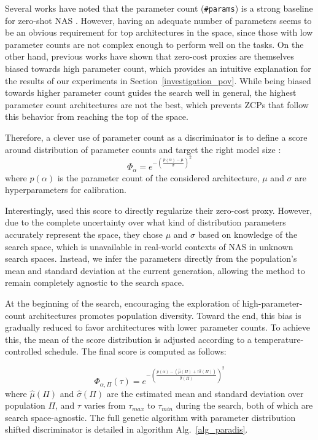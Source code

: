 \documentclass[10pt]{article} %
\begin{document}
Several works have noted that the parameter count (\texttt{\#params}) is a strong baseline for zero-shot NAS \citep{colin2022adeeperlook, javaheripi2022litetransformersearch}. However, having an adequate number of parameters seems to be an obvious requirement for top architectures in the space, since those with low parameter counts are not complex enough to perform well on the tasks. On the other hand, previous works \citep{kadlecova2024surprisingly, krishnakumar2022bench} have shown that zero-cost proxies are themselves biased towards high parameter count, which provides an intuitive explanation for the results of our experiments in Section~\ref{investigation_pov}. While being biased towards higher parameter count guides the search well in general, the highest parameter count architectures are not the best, which prevents ZCPs that follow this behavior from reaching the top of the space.

Therefore, a clever use of parameter count as a discriminator is to define a score around distribution of parameter counts and target the right model size :
$$
\Phi_\alpha = e^{-(\frac{p(\alpha) - \mu}{\sigma})^2}
$$
where $p(\alpha)$ is the parameter count of the considered architecture, $\mu$ and $\sigma$ are hyperparameters for calibration.

Interestingly, \citet{peng2024swap} used this score to directly regularize their zero-cost proxy. However, due to the complete uncertainty over what kind of distribution parameters accurately represent the space, they chose $\mu$ and $\sigma$ based on knowledge of the search space, which is unavailable in real-world contexts of NAS in unknown search spaces. Instead, we infer the parameters directly from the population's mean and standard deviation at the current generation, allowing the method to remain completely agnostic to the search space.

At the beginning of the search, encouraging the exploration of high-parameter-count architectures promotes population diversity. Toward the end, this bias is gradually reduced to favor architectures with lower parameter counts. To achieve this, the mean of the score distribution is adjusted according to a temperature-controlled schedule. The final score is computed as follows:

$$
\Phi_{\alpha, \Pi}(\tau) = e^{-(\frac{p(\alpha) - (\hat{\mu}(\Pi) + \tau\hat{\sigma}(\Pi))}{\hat{\sigma}(\Pi)})^2}
$$
where $\hat{\mu}(\Pi)$ and $\hat{\sigma}(\Pi)$ are the estimated mean and standard deviation over population $\Pi$, and $\tau$ varies from $\tau_{max}$ to $\tau_{min}$ during the search, both of which are search space-agnostic. The full genetic algorithm with parameter distribution shifted discriminator is detailed in algorithm Alg.~\ref{alg_paradis}.
\end{document}
